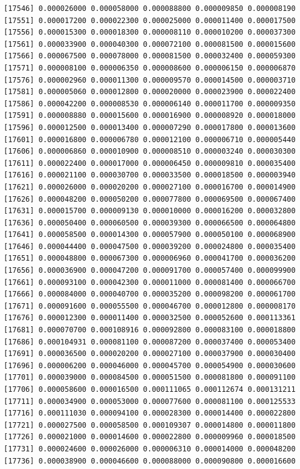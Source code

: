 \documentclass[]{article}
\begin{document}
\begin{verbatim}
[17546] 0.000026000 0.000058000 0.000088800 0.000009850 0.000008190
[17551] 0.000017200 0.000022300 0.000025000 0.000011400 0.000017500
[17556] 0.000015300 0.000018300 0.000008110 0.000010200 0.000037300
[17561] 0.000033900 0.000040300 0.000072100 0.000081500 0.000015600
[17566] 0.000067500 0.000078000 0.000081500 0.000032400 0.000059300
[17571] 0.000008100 0.000006350 0.000008600 0.000006150 0.000006870
[17576] 0.000002960 0.000011300 0.000009570 0.000014500 0.000003710
[17581] 0.000005060 0.000012800 0.000020000 0.000023900 0.000022400
[17586] 0.000042200 0.000008530 0.000006140 0.000011700 0.000009350
[17591] 0.000008880 0.000015600 0.000016900 0.000008920 0.000018000
[17596] 0.000012500 0.000013400 0.000007290 0.000017800 0.000013600
[17601] 0.000016800 0.000006780 0.000012100 0.000006710 0.000005440
[17606] 0.000006860 0.000010900 0.000008510 0.000003240 0.000030300
[17611] 0.000022400 0.000017000 0.000006450 0.000009810 0.000035400
[17616] 0.000021100 0.000030700 0.000033500 0.000018500 0.000003940
[17621] 0.000026000 0.000020200 0.000027100 0.000016700 0.000014900
[17626] 0.000048200 0.000050200 0.000077800 0.000069500 0.000067400
[17631] 0.000015700 0.000009130 0.000010000 0.000016200 0.000032800
[17636] 0.000050400 0.000060500 0.000039300 0.000066500 0.000064800
[17641] 0.000058500 0.000014300 0.000057900 0.000050100 0.000068900
[17646] 0.000044400 0.000047500 0.000039200 0.000024800 0.000035400
[17651] 0.000048800 0.000067300 0.000006960 0.000041700 0.000036200
[17656] 0.000036900 0.000047200 0.000091700 0.000057400 0.000099900
[17661] 0.000093100 0.000042300 0.000011000 0.000081400 0.000066700
[17666] 0.000084000 0.000040700 0.000035200 0.000098200 0.000061700
[17671] 0.000091600 0.000055500 0.000046700 0.000012800 0.000008170
[17676] 0.000012300 0.000011400 0.000032500 0.000052600 0.000113361
[17681] 0.000070700 0.000108916 0.000092800 0.000083100 0.000018800
[17686] 0.000104931 0.000081100 0.000087200 0.000037400 0.000053400
[17691] 0.000036500 0.000020200 0.000027100 0.000037900 0.000030400
[17696] 0.000006200 0.000046000 0.000045700 0.000054900 0.000030600
[17701] 0.000039000 0.000084500 0.000051500 0.000081800 0.000091100
[17706] 0.000058600 0.000016500 0.000111065 0.000112674 0.000131211
[17711] 0.000034900 0.000053000 0.000077600 0.000081100 0.000125533
[17716] 0.000111030 0.000094100 0.000028300 0.000014400 0.000022800
[17721] 0.000027500 0.000058500 0.000109307 0.000014800 0.000011800
[17726] 0.000021000 0.000014600 0.000022800 0.000009960 0.000018500
[17731] 0.000024600 0.000026000 0.000006310 0.000014000 0.000048200
[17736] 0.000038900 0.000046600 0.000088000 0.000090800 0.000016600

\end{verbatim}
\end{document}
